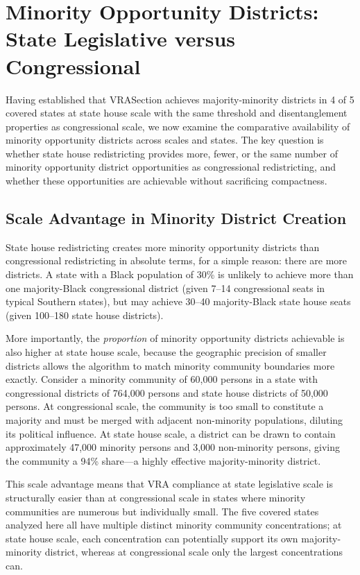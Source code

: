 \section{Minority Opportunity Districts: State Legislative versus Congressional}
\label{sec:comparison}

Having established that VRASection achieves majority-minority districts in 4 of 5 covered states at state house scale with the same threshold and disentanglement properties as congressional scale, we now examine the comparative availability of minority opportunity districts across scales and states. The key question is whether state house redistricting provides more, fewer, or the same number of minority opportunity district opportunities as congressional redistricting, and whether these opportunities are achievable without sacrificing compactness.

\subsection{Scale Advantage in Minority District Creation}

State house redistricting creates more minority opportunity districts than congressional redistricting in absolute terms, for a simple reason: there are more districts. A state with a Black population of 30\% is unlikely to achieve more than one majority-Black congressional district (given 7--14 congressional seats in typical Southern states), but may achieve 30--40 majority-Black state house seats (given 100--180 state house districts).

More importantly, the \textit{proportion} of minority opportunity districts achievable is also higher at state house scale, because the geographic precision of smaller districts allows the algorithm to match minority community boundaries more exactly. Consider a minority community of 60,000 persons in a state with congressional districts of 764,000 persons and state house districts of 50,000 persons. At congressional scale, the community is too small to constitute a majority and must be merged with adjacent non-minority populations, diluting its political influence. At state house scale, a district can be drawn to contain approximately 47,000 minority persons and 3,000 non-minority persons, giving the community a 94\% share---a highly effective majority-minority district.

This scale advantage means that VRA compliance at state legislative scale is structurally easier than at congressional scale in states where minority communities are numerous but individually small. The five covered states analyzed here all have multiple distinct minority community concentrations; at state house scale, each concentration can potentially support its own majority-minority district, whereas at congressional scale only the largest concentrations can.

